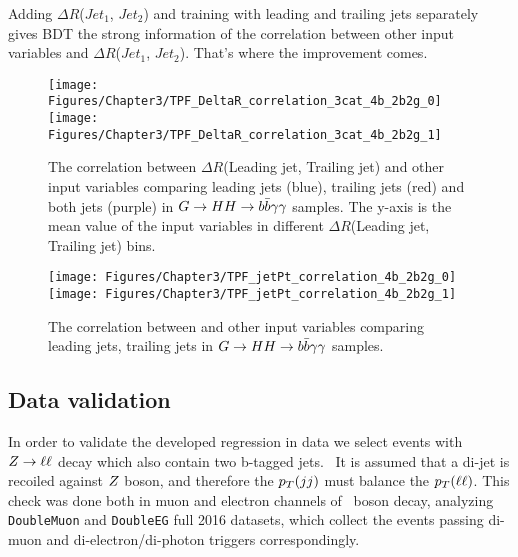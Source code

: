Adding $\Delta R$($Jet_{1}$, $Jet_{2}$) and training with leading and trailing jets separately gives BDT the strong information of the correlation between other input variables and $\Delta R$($Jet_{1}$, $Jet_{2}$).
That's where the improvement comes.

\begin{figure*}[thb]
  \centering
  \texttt{[image: Figures/Chapter3/TPF\_DeltaR\_correlation\_3cat\_4b\_2b2g\_0]}\hfil
  \texttt{[image: Figures/Chapter3/TPF\_DeltaR\_correlation\_3cat\_4b\_2b2g\_1]}\hfil
  \caption{The correlation between $\Delta R$(Leading jet, Trailing jet) and other input 
  variables comparing leading jets (blue), trailing jets (red) and both jets (purple) in $G\to HH\to b\bar{b}\gamma\gamma$ samples. 
  The y-axis is the mean value of the input variables in different 
  $\Delta R$(Leading jet, Trailing jet) bins.}
  \label{fig:b-reg-cor-DR}
\end{figure*}

\begin{figure*}[thb]
  \centering
  \texttt{[image: Figures/Chapter3/TPF\_jetPt\_correlation\_4b\_2b2g\_0]}\hfil
  \texttt{[image: Figures/Chapter3/TPF\_jetPt\_correlation\_4b\_2b2g\_1]}\hfil
  \caption{The correlation between \PT and other input 
  variables comparing leading jets, trailing jets  in $G\to HH\to b\bar{b}\gamma\gamma$ samples. }
  \label{fig:b-reg-cor-jetPt}
\end{figure*}

\clearpage

\subsection{Data validation}

In order to validate the developed regression in data we select events with $Z\to\ell\ell$ decay which also contain two b-tagged jets.~\cite{1310.3687}
It is assumed that a di-jet is recoiled against $Z$ boson, and therefore the $p_{T}(jj)$ must balance the $p_{T}(\ell\ell)$.
This check was done both in muon and electron channels of \Z~boson decay, analyzing \verb|DoubleMuon| and \verb|DoubleEG| full 2016 datasets, which collect the events passing di-muon and di-electron/di-photon triggers correspondingly. 

